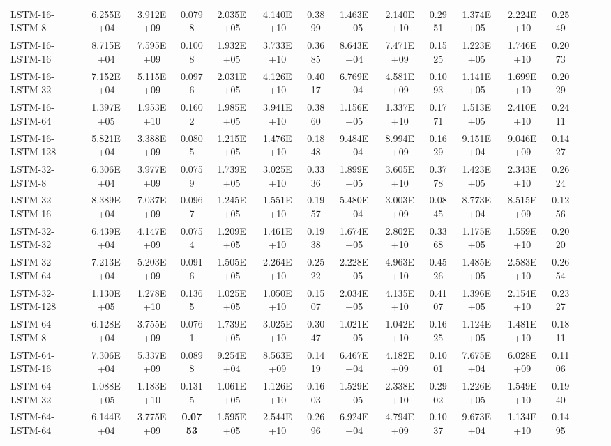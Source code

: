 \begin{landscape}
\begin{longtable}{|l|c|c|c|c|c|c|c|c|c|c|c|c|c|c|c|}
    LSTM-16-LSTM-8 & 6.255E+04 & 3.912E+09 & 0.0798 & 2.035E+05 & 4.140E+10 & 0.3899 & 1.463E+05 & 2.140E+10 & 0.2951 & 1.374E+05 & 2.224E+10 & 0.2549 \\
    LSTM-16-LSTM-16 & 8.715E+04 & 7.595E+09 & 0.1008 & 1.932E+05 & 3.733E+10 & 0.3685 & 8.643E+04 & 7.471E+09 & 0.1525 & 1.223E+05 & 1.746E+10 & 0.2073 \\
    LSTM-16-LSTM-32 & 7.152E+04 & 5.115E+09 & 0.0976 & 2.031E+05 & 4.126E+10 & 0.4017 & 6.769E+04 & 4.581E+09 & 0.1093 & 1.141E+05 & 1.699E+10 & 0.2029 \\
    LSTM-16-LSTM-64 & 1.397E+05 & 1.953E+10 & 0.1602 & 1.985E+05 & 3.941E+10 & 0.3860 & 1.156E+05 & 1.337E+10 & 0.1771 & 1.513E+05 & 2.410E+10 & 0.2411 \\
    LSTM-16-LSTM-128 & 5.821E+04 & 3.388E+09 & 0.0805 & 1.215E+05 & 1.476E+10 & 0.1848 & 9.484E+04 & 8.994E+09 & 0.1629 & 9.151E+04 & 9.046E+09 & 0.1427 \\
    LSTM-32-LSTM-8 & 6.306E+04 & 3.977E+09 & 0.0759 & 1.739E+05 & 3.025E+10 & 0.3336 & 1.899E+05 & 3.605E+10 & 0.3778 & 1.423E+05 & 2.343E+10 & 0.2624 \\
    LSTM-32-LSTM-16 & 8.389E+04 & 7.037E+09 & 0.0967 & 1.245E+05 & 1.551E+10 & 0.1957 & 5.480E+04 & 3.003E+09 & 0.0845 & 8.773E+04 & 8.515E+09 & 0.1256 \\
    LSTM-32-LSTM-32 & 6.439E+04 & 4.147E+09 & 0.0754 & 1.209E+05 & 1.461E+10 & 0.1938 & 1.674E+05 & 2.802E+10 & 0.3368 & 1.175E+05 & 1.559E+10 & 0.2020 \\
    LSTM-32-LSTM-64 & 7.213E+04 & 5.203E+09 & 0.0916 & 1.505E+05 & 2.264E+10 & 0.2522 & 2.228E+05 & 4.963E+10 & 0.4526 & 1.485E+05 & 2.583E+10 & 0.2654 \\
    LSTM-32-LSTM-128 & 1.130E+05 & 1.278E+10 & 0.1365 & 1.025E+05 & 1.050E+10 & 0.1507 & 2.034E+05 & 4.135E+10 & 0.4107 & 1.396E+05 & 2.154E+10 & 0.2327 \\
    LSTM-64-LSTM-8 & 6.128E+04 & 3.755E+09 & 0.0761 & 1.739E+05 & 3.025E+10 & 0.3047 & 1.021E+05 & 1.042E+10 & 0.1625 & 1.124E+05 & 1.481E+10 & 0.1811 \\
    LSTM-64-LSTM-16 & 7.306E+04 & 5.337E+09 & 0.0898 & 9.254E+04 & 8.563E+09 & 0.1419 & 6.467E+04 & 4.182E+09 & 0.1001 & 7.675E+04 & 6.028E+09 & 0.1106 \\
    LSTM-64-LSTM-32 & 1.088E+05 & 1.183E+10 & 0.1315 & 1.061E+05 & 1.126E+10 & 0.1603 & 1.529E+05 & 2.338E+10 & 0.2902 & 1.226E+05 & 1.549E+10 & 0.1940 \\
    LSTM-64-LSTM-64 & 6.144E+04 & 3.775E+09 & \cellcolor[rgb]{ .573,  .816,  .314}\textbf{0.0753} & 1.595E+05 & 2.544E+10 & 0.2696 & 6.924E+04 & 4.794E+09 & 0.1037 & 9.673E+04 & 1.134E+10 & 0.1495 \\

\end{longtable}
\end{landscape}
